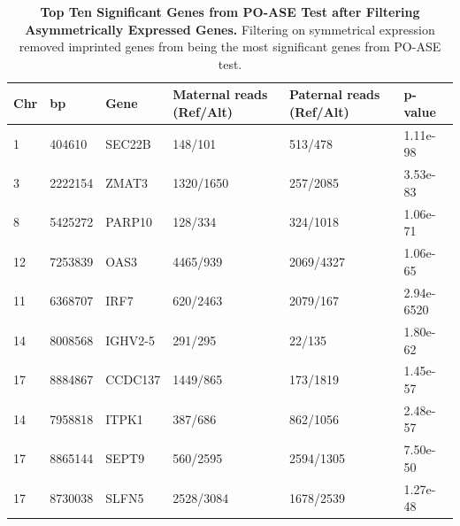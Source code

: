 \begin{table}[!htb]
\centering
\begin{adjustbox}{width={\textwidth}}
\begin{tabular}{@{}p{1cm}p{3cm}p{3cm}p{5cm}p{5cm}p{3cm}@{}}
 \toprule  Chr & bp & Gene & Maternal reads (Ref/Alt) & Paternal reads (Ref/Alt) & p-value \\ \midrule
1 & 404610 & SEC22B & 148/101 & 513/478 & 1.11e-98 \\
3 & 2222154 & ZMAT3 & 1320/1650 & 257/2085 & 3.53e-83\\
8 & 5425272 & PARP10 & 128/334 & 324/1018 & 1.06e-71 \\
12 & 7253839 & OAS3 & 4465/939 & 2069/4327 & 1.06e-65 \\
11 & 6368707 & IRF7 & 620/2463 & 2079/167 & 2.94e-6520 \\
14 & 8008568 & IGHV2-5 & 291/295 & 22/135 & 1.80e-62 \\
17 & 8884867 & CCDC137 & 1449/865 & 173/1819 & 1.45e-57\\
14 & 7958818 & ITPK1 & 387/686 & 862/1056 & 2.48e-57\\
17 & 8865144 & SEPT9 & 560/2595 & 2594/1305 & 7.50e-50\\
17 & 8730038 & SLFN5 & 2528/3084 & 1678/2539 & 1.27e-48\\  \bottomrule
\end{tabular}
\end{adjustbox}
\caption[Top Ten Significant Genes from PO-ASE Test after Filtering Asymmetrically Expressed Genes.]{\textbf{Top Ten Significant Genes from PO-ASE Test after Filtering Asymmetrically Expressed Genes.} Filtering on symmetrical expression removed imprinted genes from being the most significant genes from PO-ASE test.}
\label{tab:poase2}
\end{table}



